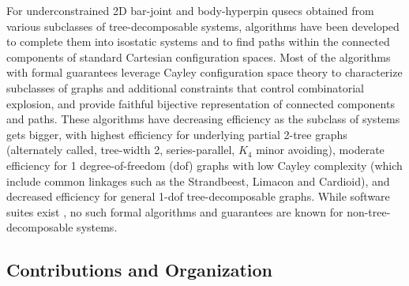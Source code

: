 \medskip\noindent
{}
For underconstrained 2D bar-joint and body-hyperpin qusecs obtained from various subclasses of tree-decomposable systems, algorithms have been developed to complete them into isostatic systems \cite{joan-arinyo2003transforming,sitharam2005combinatorial,gao2006ctree,sitharam2010convex} and to find paths within the connected components \cite{sitharam2011cayleyI,hidalgo2011reachability} of standard Cartesian configuration spaces. Most of the algorithms with formal guarantees leverage Cayley configuration space theory \cite{sitharam2010convex,sitharam2011cayleyI,sitharam2011cayleyII} to characterize subclasses of graphs and additional constraints that control combinatorial explosion, and provide faithful bijective representation of connected components and paths. These algorithms have decreasing efficiency as the subclass of systems gets bigger, with highest efficiency for underlying partial 2-tree graphs (alternately called, tree-width 2, series-parallel, $K_4$ minor avoiding), moderate efficiency for 1 degree-of-freedom (dof) graphs with low Cayley complexity (which include common linkages such as the Strandbeest, Limacon and Cardioid), and decreased efficiency for general 1-dof tree-decomposable graphs. While software suites exist  \cite{keycurriculum1995geometer,porta2014open,siemens1999d,todd2007geometry}, no such formal algorithms and guarantees are known for non-tree-decomposable systems.
%
\subsection{Contributions and Organization}
\label{sec:cont}

